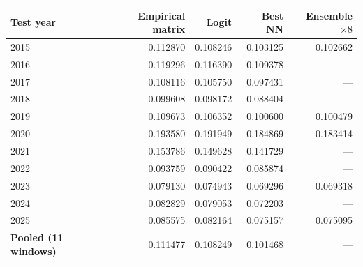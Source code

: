 \begin{tabular}{lrrrr}
\toprule
Test year & Empirical matrix & Logit & Best NN & Ensemble $\times 8$ \\
\midrule
2015 & 0.112870 & 0.108246 & 0.103125 & 0.102662 \\
2016 & 0.119296 & 0.116390 & 0.109378 & --- \\
2017 & 0.108116 & 0.105750 & 0.097431 & --- \\
2018 & 0.099608 & 0.098172 & 0.088404 & --- \\
2019 & 0.109673 & 0.106352 & 0.100600 & 0.100479 \\
2020 & 0.193580 & 0.191949 & 0.184869 & 0.183414 \\
2021 & 0.153786 & 0.149628 & 0.141729 & --- \\
2022 & 0.093759 & 0.090422 & 0.085874 & --- \\
2023 & 0.079130 & 0.074943 & 0.069296 & 0.069318 \\
2024 & 0.082829 & 0.079053 & 0.072203 & --- \\
2025 & 0.085575 & 0.082164 & 0.075157 & 0.075095 \\
\midrule
\textbf{Pooled (11 windows)} & 0.111477 & 0.108249 & 0.101468 & --- \\
\bottomrule
\end{tabular}
